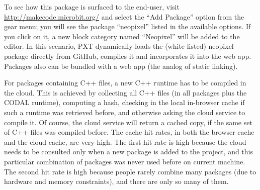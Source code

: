 To see how this
package is surfaced to the end-user, visit \url{http://makecode.microbit.org/} and select the ``Add Package'' option from the
gear menu; you will see the package ``neopixel'' listed in the available options. If you click on it, a new block category
named ``Neopixel'' will be added to the editor. In this scenario, PXT dynamically loads the (white listed) neopixel 
package directly from GitHub, compiles it and incorporates it into the web app. Packages also can be bundled with a web
app (the analog of static linking).  

For packages containing C++ files, a new C++ runtime has to be compiled in the cloud.
This is achieved by collecting all C++ files (in all packages plus the CODAL runtime),
computing a hash, checking in the local in-browser cache if such a runtime was retrieved
before, and otherwise asking the cloud service to compile it.
Of course, the cloud service will return a cached copy, if the same set of C++
files was compiled before. The cache hit rates, in both the browser cache
and the cloud cache, are very high. 
The first hit rate is high because the cloud needs to be consulted
only when a new package is added to the project, and this particular combination 
of packages was never used before on current machine.
The second hit rate is high because people rarely combine many packages (due to
hardware and memory constraints), and there are only so many of them.
